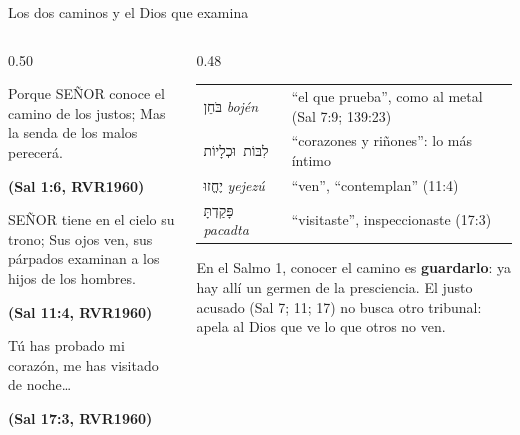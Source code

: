 \documentclass[hyperref={bookmarks=false},aspectratio=169]{beamer}
\newcommand{\heb}[1]{\mbox{\foreignlanguage{hebrew}{#1}}}
\newcommand{\SENOR}{S{\fontsize{0.78em}{1em}\selectfont EÑOR}}
\newcommand{\fuente}[1]{\par\hfill{\upshape\bfseries\footnotesize\textcolor{azul}{#1}}}
\newcommand{\destacar}[1]{\textbf{\textcolor{azul}{#1}}}
\begin{document}
\begin{frame}{Los dos caminos y el Dios que examina}
\begin{columns}[t,onlytextwidth]
\begin{column}{0.50\textwidth}
\begin{cita}Porque \SENOR{} conoce el camino de los justos; Mas la senda de los malos perecerá.\fuente{(Sal 1:6, RVR1960)}\end{cita}
\begin{cita}\SENOR{} tiene en el cielo su trono; Sus ojos ven, sus párpados examinan a los hijos de los hombres.\fuente{(Sal 11:4, RVR1960)}\end{cita}
\begin{cita}Tú has probado mi corazón, me has visitado de noche\ldots\fuente{(Sal 17:3, RVR1960)}\end{cita}
\end{column}
\begin{column}{0.48\textwidth}\scriptsize
\renewcommand{\arraystretch}{1.1}
\begin{tabular}{@{}>{\RaggedRight\arraybackslash}p{1.9cm}>{\RaggedRight\arraybackslash}p{3.5cm}@{}}
\toprule
\heb{בֹּחֵן} \emph{bojén} & ``el que prueba'', como al metal (Sal 7:9; 139:23) \\
\heb{לִבּוֹת וּכְלָיוֹת} & ``corazones y riñones'': lo más íntimo \\
\heb{יֶחֱזוּ} \emph{yejezú} & ``ven'', ``contemplan'' (11:4) \\
\heb{פָּקַדְתָּ} \emph{pacadta} & ``visitaste'', inspeccionaste (17:3) \\
\bottomrule
\end{tabular}\par\smallskip
\small En el Salmo 1, conocer el camino es \destacar{guardarlo}: ya hay allí un germen de la presciencia. El justo acusado (Sal 7; 11; 17) no busca otro tribunal: apela al Dios que ve lo que otros no ven.
\end{column}
\end{columns}
\end{frame}
\end{document}
